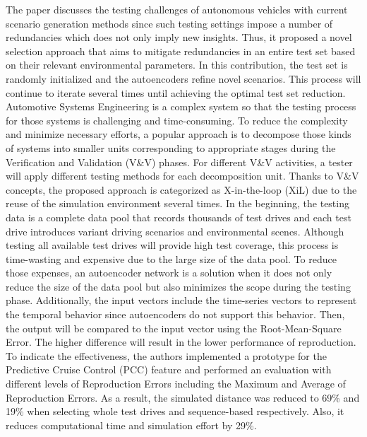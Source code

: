 \documentclass[10pt,a4paper]{report}
\begin{document}
The paper discusses the testing challenges of autonomous vehicles with current scenario generation methods since such testing settings impose a number of redundancies which does not only imply new insights.
%
Thus, it proposed a novel selection approach that aims to mitigate redundancies in an entire test set based on their relevant environmental parameters.
%
In this contribution, the test set is randomly initialized and the autoencoders refine novel scenarios.
%
This process will continue to iterate several times until achieving the optimal test set reduction.
%
Automotive Systems Engineering is a complex system so that the testing process for those systems is challenging and time-consuming.
%
To reduce the complexity and minimize necessary efforts, a popular approach is to decompose those kinds of systems into smaller units corresponding to appropriate stages during the Veriﬁcation and Validation (V\&V) phases.
%
For different V\&V activities, a tester will apply different testing methods for each decomposition unit.
%
Thanks to V\&V concepts, the proposed approach is categorized as X-in-the-loop (XiL) due to the reuse of the simulation environment several times.
%
In the beginning, the testing data is a complete data pool that records thousands of test drives and each test drive introduces variant driving scenarios and environmental scenes.
%
Although testing all available test drives will provide high test coverage, this process is time-wasting and expensive due to the large size of the data pool. 
%
To reduce those expenses, an autoencoder network is a solution when it does not only reduce the size of the data pool but also minimizes the scope during the testing phase.
%
Additionally, the input vectors include the time-series vectors to represent the temporal behavior since autoencoders do not support this behavior.
%
Then, the output will be compared to the input vector using the Root-Mean-Square Error.
%
The higher difference will result in the lower performance of reproduction.
%
To indicate the effectiveness, the authors implemented a prototype for the Predictive Cruise Control (PCC) feature and performed an evaluation with different levels of Reproduction Errors including the Maximum and Average of Reproduction Errors.
%
As a result, the simulated distance was reduced to 69\% and 19\% when selecting whole test drives and sequence-based respectively. Also, it reduces computational time and simulation effort by 29\%.
\end{document}
